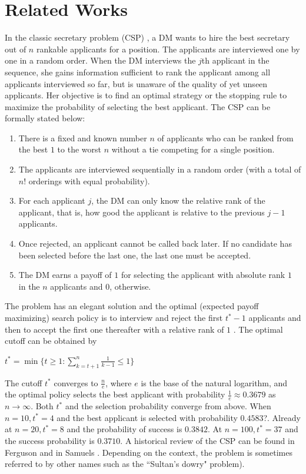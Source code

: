 \documentclass[conference]{IEEEtran}
\theoremstyle{definition}
\begin{document}
\section{Related Works} \label{related}
In the classic secretary problem (CSP) \cite{CSP}, a DM wants to hire the best secretary out of $n$ rankable applicants for a position. The applicants are interviewed one by one in a random order.  When the DM interviews the $j$th applicant in the sequence, she gains information sufficient to rank the applicant among all applicants interviewed so far, but is unaware of the quality of yet unseen applicants.   Her objective is to find an optimal strategy or the stopping rule to maximize the probability of selecting the best applicant. The CSP can be formally stated below:


\begin{enumerate}
\item  There is a fixed and known number $n$ of applicants who can be ranked from the best $1$ to the worst $n$ without a tie competing for a single position.
\item The applicants are interviewed sequentially in a random order (with a total of $n!$ orderings with equal probability).
\item For each applicant $j$, the DM can only know the relative rank of the applicant, that is, how good the applicant is relative to the previous $j-1$ applicants.
\item Once rejected, an applicant cannot be called back later. If no candidate has been selected before the last one, the last one must be accepted.
\item The DM earns a payoff of $1$ for selecting the applicant with absolute rank $1$ in the $n$ applicants and $0$, otherwise.
\end{enumerate}


The problem has an elegant solution and the optimal (expected payoff maximizing) search policy is to interview and reject the first $t^{*}-1$ applicants and then to accept the first one thereafter with a relative rank of $1$ \cite{Gilbert1966}. The optimal cutoff can be obtained by

$t^{*} = \min \{t \geq 1: \sum_{k=t+1}^{n} \frac{1}{k-1} \leq 1\} $

The cutoff $t^{*}$ converges to $\frac {n}{e}$, where $e$ is the base of the natural logarithm, and the optimal policy selects the best applicant with probability $\frac {1} {e} \approx 0.3679$ as $n \rightarrow \infty$. Both $t^{*}$ and the selection probability converge from above. When $n=10, t^{*}=4$ and the best applicant is selected with probability $0.4583$?. Already at $n=20, t^{*}=8$ and the probability of success is $0.3842$. At $n=100, t^{*}=37$ and the success probability is $0.3710$. A historical review of the CSP can be found in Ferguson \cite{Ferguson1989} and in Samuels \cite{Samuels1992}. Depending on the context, the problem is sometimes referred to by other names such as the ``Sultan’s dowry" problem).
\end{document}

